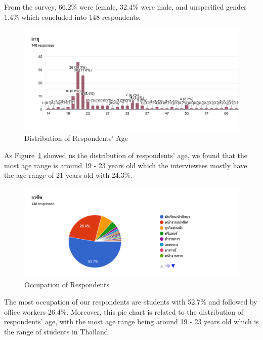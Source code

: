 \documentclass[12pt,oneside,openright,a4paper]{cpe-english-project}
\begin{document}
From the survey, 66.2\% were female, 32.4\% were male, and unspecified gender 1.4\% which concluded into 148 respondents.

\begin{figure}[H]\centering
\includegraphics[width=350pt]{./images/A1DistributionofRespondentsAge.png}
\caption{Distribution of Respondents’ Age}\label{fig:A1DistributionofRespondentsAge}
\end{figure}\vspace{-24pt}

As Figure~\ref{fig:A1DistributionofRespondentsAge} showed us the distribution of respondents’ age, we found that the most age range is around 19 - 23 years old which the interviewees mostly have the age range of 21 years old with 24.3\%.


\begin{figure}[H]\centering
\includegraphics[width=350pt]{./images/A1OccupationofRespondents.png}
\caption{Occupation of Respondents}\label{fig:A1OccupationofRespondents}
\end{figure}\vspace{-24pt}

The most occupation of our respondents are students with 52.7\% and followed by office workers 26.4\%. Moreover, this pie chart is related to the distribution of respondents’ age, with the most age range being around 19 - 23 years old which is the range of students in Thailand.
\end{document}
